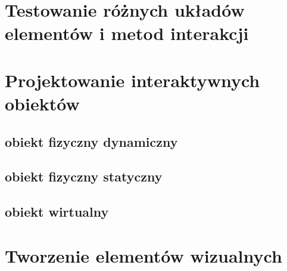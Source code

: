 \section{Testowanie różnych układów elementów i metod interakcji}
\section{Projektowanie interaktywnych obiektów}
\subsection{obiekt fizyczny dynamiczny}
\subsection{obiekt fizyczny statyczny}
\subsection{obiekt wirtualny}
\section{Tworzenie elementów wizualnych}


